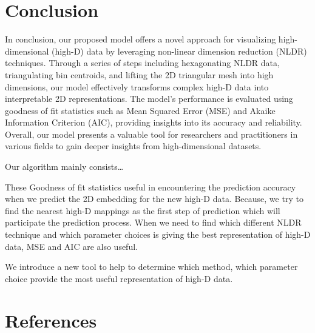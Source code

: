 \documentclass[
  12pt]{article}
\begin{document}
\section{Conclusion}\label{sec-conclusions}

In conclusion, our proposed model offers a novel approach for
visualizing high-dimensional (high-D) data by leveraging non-linear
dimension reduction (NLDR) techniques. Through a series of steps
including hexagonating NLDR data, triangulating bin centroids, and
lifting the 2D triangular mesh into high dimensions, our model
effectively transforms complex high-D data into interpretable 2D
representations. The model's performance is evaluated using goodness of
fit statistics such as Mean Squared Error (MSE) and Akaike Information
Criterion (AIC), providing insights into its accuracy and reliability.
Overall, our model presents a valuable tool for researchers and
practitioners in various fields to gain deeper insights from
high-dimensional datasets.

Our algorithm mainly consists\ldots{}

These Goodness of fit statistics useful in encountering the prediction
accuracy when we predict the 2D embedding for the new high-D data.
Because, we try to find the nearest high-D mappings as the first step of
prediction which will participate the prediction process. When we need
to find which different NLDR technique and which parameter choices is
giving the best representation of high-D data, MSE and AIC are also
useful.

We introduce a new tool to help to determine which method, which
parameter choice provide the most useful representation of high-D data.

\section*{References}\label{references}

\renewcommand{\bibsection}{}


\newpage{}
\end{document}
